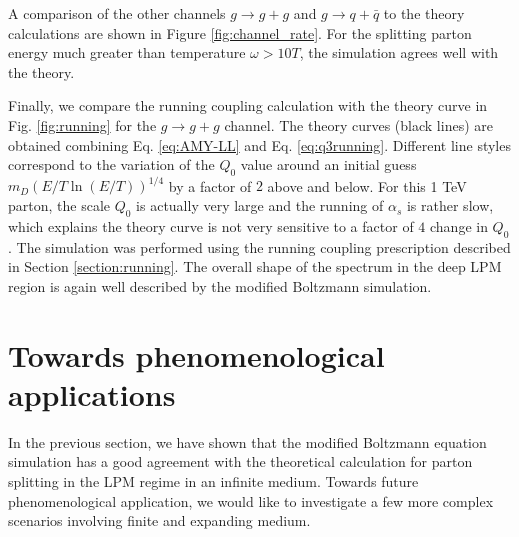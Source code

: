 \documentclass[aps, prc, reprint, amsmath, groupedaddress, nofootinbib]{revtex4-1}
\begin{document}
A comparison of the other channels $g\rightarrow g+g$ and $g\rightarrow q+\bar{q}$ to the theory calculations are shown in Figure \ref{fig:channel_rate}.
For the splitting parton energy much greater than temperature $\omega > 10 T$, the simulation agrees well with the theory. 

Finally, we compare the running coupling calculation with the theory curve in Fig. \ref{fig:running} for the $g\rightarrow g+g$ channel.
The theory curves (black lines) are obtained combining Eq. \ref{eq:AMY-LL} and Eq. \ref{eq:q3running}.
Different line styles correspond to the variation of the $Q_0$ value around an initial guess $m_D (E/T \ln(E/T) )^{1/4}$ by a factor of $2$ above and below.
For this 1 TeV parton, the scale $Q_0$ is actually very large and the running of $\alpha_s$ is rather slow, which explains the theory curve is not very sensitive to a factor of $4$ change in $Q_0$.
The simulation was performed using the running coupling prescription described in Section \ref{section:running}.
The overall shape of the spectrum in the deep LPM region is again well described by the modified Boltzmann simulation. 


\section{Towards phenomenological applications}\label{section:more}
In the previous section, we have shown that the modified Boltzmann equation simulation has a good agreement with the theoretical calculation for parton splitting in the LPM regime in an infinite medium.
Towards future phenomenological application, we would like to investigate a few more complex scenarios involving finite and expanding medium.
\end{document}
